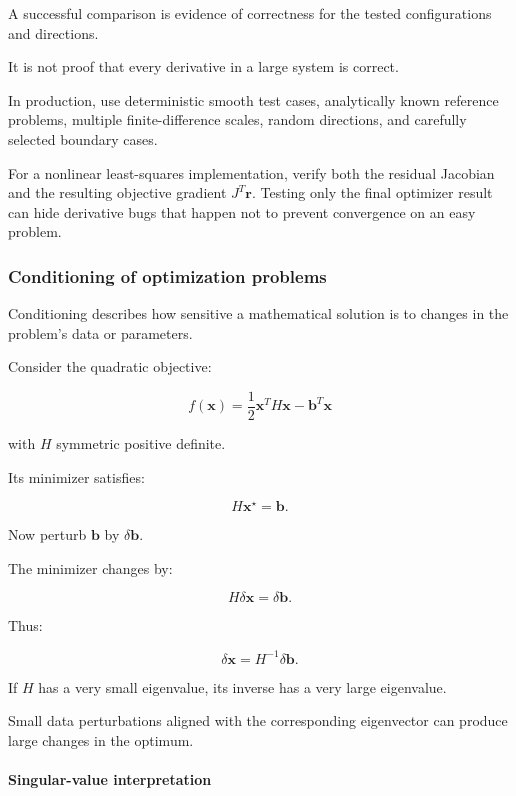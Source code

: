 A successful comparison is evidence of correctness for the tested configurations and directions.

It is not proof that every derivative in a large system is correct.

In production, use deterministic smooth test cases, analytically known reference problems, multiple finite-difference scales, random directions, and carefully selected boundary cases.

For a nonlinear least-squares implementation, verify both the residual Jacobian and the resulting objective gradient \(J^T\mathbf r\). Testing only the final optimizer result can hide derivative bugs that happen not to prevent convergence on an easy problem.

\subsubsection{Conditioning of optimization problems}\label{02-foundations-ii-ch027-conditioning-of-optimization-problems}

\hypertarget{02-foundations-ii-ch027-conditioning-of-optimization-problems}{}

Conditioning describes how sensitive a mathematical solution is to changes in the problem's data or parameters.

Consider the quadratic objective:

\[
f(\mathbf x)= \frac12\mathbf x^TH\mathbf x-\mathbf b^T\mathbf x
\]

with \(H\) symmetric positive definite.

Its minimizer satisfies:

\[
H\mathbf x^\star=\mathbf b.
\]

Now perturb \(\mathbf b\) by \(\delta\mathbf b\).

The minimizer changes by:

\[
H\delta\mathbf x=\delta\mathbf b.
\]

Thus:

\[
\boxed{ \delta\mathbf x=H^{-1}\delta\mathbf b }.
\]

If \(H\) has a very small eigenvalue, its inverse has a very large eigenvalue.

Small data perturbations aligned with the corresponding eigenvector can produce large changes in the optimum.

\paragraph{Singular-value interpretation}\label{02-foundations-ii-ch027-singular-value-interpretation}

